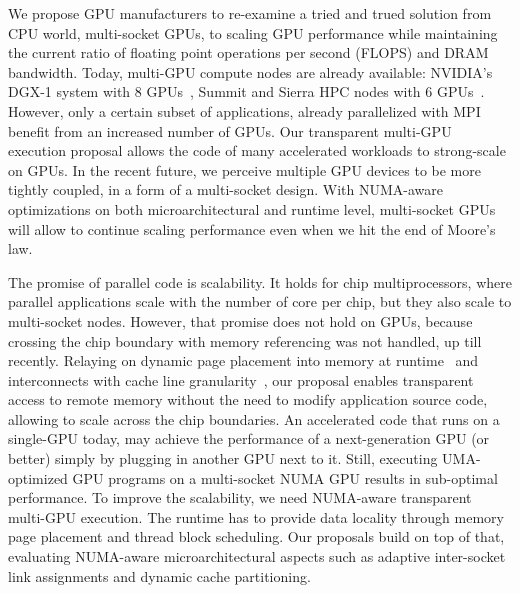 \documentclass{sig-alternate}
\begin{document}
We propose GPU manufacturers to re-examine a tried and trued solution from CPU world, multi-socket GPUs, to scaling GPU performance while maintaining the current ratio of floating point operations per second (FLOPS) and DRAM bandwidth. Today, multi-GPU compute nodes are already available: NVIDIA's DGX-1 system with 8 GPUs~\cite{dgx}, Summit and Sierra HPC nodes with 6 GPUs~\cite{summit_supercompute}. However, only a certain subset of applications, already parallelized with MPI benefit from an increased number of GPUs. Our transparent multi-GPU execution proposal allows the code of many accelerated workloads to strong-scale on GPUs. In the recent future, we perceive multiple GPU devices to be more tightly coupled, in a form of a multi-socket design. With NUMA-aware optimizations on both microarchitectural and runtime level, multi-socket GPUs will allow to continue scaling performance even when we hit the end of Moore's law.

The promise of parallel code is scalability. It holds for chip multiprocessors, where parallel applications scale with the number of core per chip, but they also scale to multi-socket nodes. However, that promise does not hold on GPUs, because crossing the chip boundary with memory referencing was not handled, up till recently. Relaying on dynamic page placement into memory at runtime~\cite{UVM} and interconnects with cache line granularity~\cite{NVLINK}, our proposal enables transparent access to remote memory without the need to modify application source code, allowing to scale across the chip boundaries. An accelerated code that runs on a single-GPU today, may achieve the performance of a next-generation GPU (or better) simply by plugging in another GPU next to it. Still, executing UMA-optimized GPU programs on a multi-socket NUMA GPU results in sub-optimal performance. To improve the scalability, we need NUMA-aware transparent multi-GPU execution. The runtime has to provide data locality through memory page placement and thread block scheduling. Our proposals build on top of that, evaluating NUMA-aware microarchitectural aspects such as adaptive inter-socket link assignments and dynamic cache partitioning.
\end{document}
